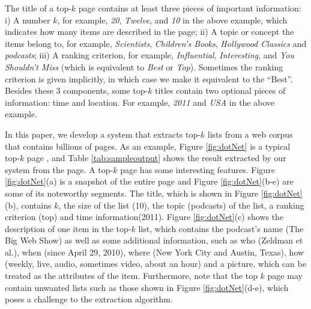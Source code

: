 The title of a top-$k$ page contains at least three pieces of
important information: i) A number $k$, for example, {\it 20}, {\it
  Twelve}, and {\it 10} in the above example, which indicates how many
items are described in the page; ii) A topic or concept the items
belong to, for example, {\it Scientists}, {\it Children's Books},
{\it Hollywood Classics} and {\it podcasts};
iii) A ranking criterion, for example, {\it
  Influential}, {\it Interesting}, and {\it You Shouldn't Miss} (which
is equivalent to {\it Best} or {\it Top}). Sometimes the ranking
criterion is given implicitly, in which case we make it equivalent to the
``Best''. Besides these 3 components, some top-$k$ titles contain
two optional pieces of information: time and location. For example,
{\it 2011} and {\it USA} in the above example.

In this paper, we develop a system that extracts top-$k$ lists from a
web corpus that contains billions of pages. As an example, Figure
\ref{fig:dotNet} is a typical top-$k$ page \cite{dotNetAwards}, and
Table \ref{tab:sampleoutput} shows the result extracted by our system
from the page.  A top-$k$ page has some interesting features. Figure
\ref{fig:dotNet}(a) is a snapshot of the entire page and Figure
\ref{fig:dotNet}(b-e) are some of its noteworthy segments.  The title,
which is shown in Figure \ref{fig:dotNet}(b), contains $k$, the size
of the list (10), the topic (podcasts) of the list, 
a ranking criterion (top) and time information(2011).  Figure
\ref{fig:dotNet}(c) shows the description of one item in the top-$k$
list, which contains the podcast's name (The Big Web Show) as well as
some additional information, such as who (Zeldman et al.), when (since
April 29, 2010), where (New York City and Austin, Texas), how (weekly,
live, audio, sometimes video, about an hour) and a picture, which can
be treated as the attributes of the item.  Furthermore, note that the
top $k$ page may contain unwanted lists such as those shown in Figure
\ref{fig:dotNet}(d-e), which poses a challenge to the 
extraction algorithm.

